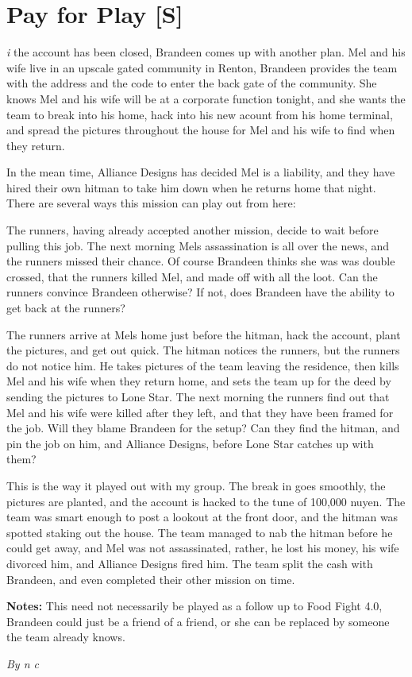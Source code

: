 \documentclass[letterpaper,twocolumn,10.5pt]{article}
\newenvironment{scenario}[6]
	{
		\section{#1 {\small[#2]}}
		\textit{#3}
		\def\TMPSCENARIO{#4 #5}
	}
	{\small\textit{By \TMPSCENARIO}}
\newcommand{\notes}{\textbf{Notes: }}
\begin{document}
\begin{scenario}{Pay for Play}
Since the account has been closed, Brandeen comes up with another plan. Mel and his wife live in an upscale gated community in Renton, Brandeen provides the team with the address and the code to enter the back gate of the community. She knows Mel and his wife will be at a corporate function tonight, and she wants the team to break into his home, hack into his new acount from his home terminal, and spread the pictures throughout the house for Mel and his wife to find when they return.

In the mean time, Alliance Designs has decided Mel is a liability, and they have hired their own hitman to take him down when he returns home that night. There are several ways this mission can play out from here:

\item The runners, having already accepted another mission, decide to wait before pulling this job. The next morning Mels assassination is all over the news, and the runners missed their chance. Of course Brandeen thinks she was was double crossed, that the runners killed Mel, and made off with all the loot. Can the runners convince Brandeen otherwise? If not, does Brandeen have the ability to get back at the runners?

\item The runners arrive at Mels home just before the hitman, hack the account, plant the pictures, and get out quick. The hitman notices the runners, but the runners do not notice him. He takes pictures of the team leaving the residence, then kills Mel and his wife when they return home, and sets the team up for the deed by sending the pictures to Lone Star. The next morning the runners find out that Mel and his wife were killed after they left, and that they have been framed for the job. Will they blame Brandeen for the setup? Can they find the hitman, and pin the job on him, and Alliance Designs, before Lone Star catches up with them?

\item This is the way it played out with my group. The break in goes smoothly, the pictures are planted, and the account is hacked to the tune of 100,000 nuyen. The team was smart enough to post a lookout at the front door, and the hitman was spotted staking out the house. The team managed to nab the hitman before he could get away, and Mel was not assassinated, rather, he lost his money, his wife divorced him, and Alliance Designs fired him. The team split the cash with Brandeen, and even completed their other mission on time.

\notes This need not necessarily be played as a follow up to Food Fight 4.0, Brandeen could just be a friend of a friend, or she can be replaced by someone the team already knows. 

\end{scenario}
\end{document}
